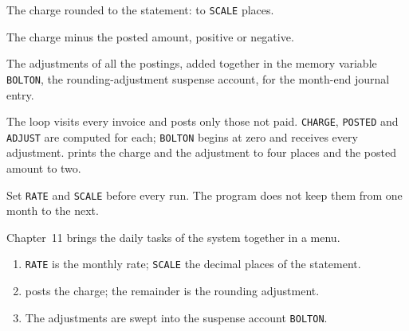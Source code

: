 The charge rounded to the statement:  to
\texttt{SCALE} places.

The charge minus the posted amount, positive or negative.

The adjustments of all the postings, added together
in the memory variable \texttt{BOLTON}, the rounding-adjustment suspense
account, for the month-end journal entry.

The loop visits every invoice and posts only those not paid.  \texttt{CHARGE},
\texttt{POSTED} and \texttt{ADJUST} are computed for each; \texttt{BOLTON} begins at
zero and receives every adjustment.   prints the charge and the
adjustment to four places and the posted amount to two.

\begin{AteNote}
Set \texttt{RATE} and \texttt{SCALE} before every run.  The program does not keep
them from one month to the next.
\end{AteNote}

Chapter~11 brings the daily tasks of the system together in a menu.

\begin{enumerate}
\item \texttt{RATE} is the monthly rate; \texttt{SCALE} the decimal places of the
  statement.
\item {} posts the charge; the remainder is the rounding adjustment.
\item The adjustments are swept into the suspense account \texttt{BOLTON}.
\end{enumerate}

